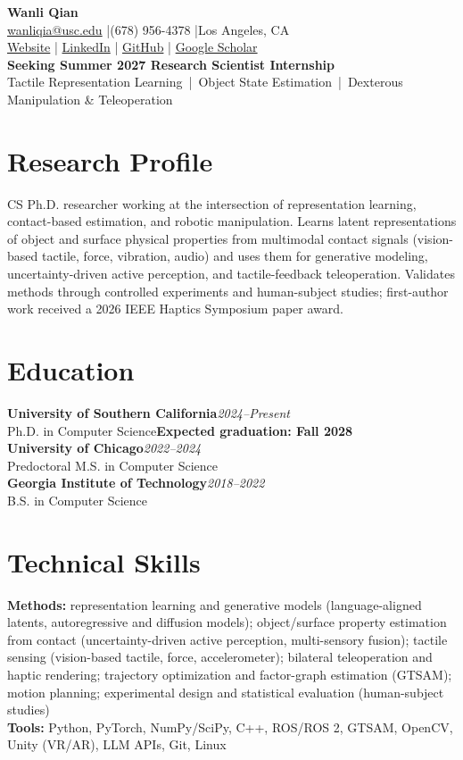 \documentclass[10pt,letterpaper]{article}
\newcommand{\entry}[2]{\textbf{#1}\hfill\textit{#2}\\}
\newcommand{\sub}[2]{#1\hfill\textbf{#2}\\}
\begin{document}
{\fontsize{24}{26}\selectfont\bfseries Wanli Qian}\\[3pt]
\href{mailto:wanliqia@usc.edu}{wanliqia@usc.edu} \enspace|\enspace (678) 956-4378 \enspace|\enspace Los Angeles, CA\\
\href{https://silverwings-zero.github.io/}{Website} \enspace|\enspace
\href{https://www.linkedin.com/in/wanli-qian-7bb399192/}{LinkedIn} \enspace|\enspace
\href{https://github.com/silverwings-zero}{GitHub} \enspace|\enspace
\href{https://scholar.google.com/citations?user=azFoAIkAAAAJ&hl=en}{Google Scholar}\\[4pt]
\textbf{Seeking Summer 2027 Research Scientist Internship}\\
{\color{navy}Tactile Representation Learning \,|\, Object State Estimation \,|\, Dexterous Manipulation \& Teleoperation}

\section{Research Profile}
CS Ph.D. researcher working at the intersection of representation learning, contact-based estimation, and robotic
manipulation. Learns latent representations of object and surface physical properties from multimodal contact signals
(vision-based tactile, force, vibration, audio) and uses them for generative modeling, uncertainty-driven active perception,
and tactile-feedback teleoperation. Validates methods through controlled experiments and human-subject studies;
first-author work received a 2026 IEEE Haptics Symposium paper award.

\section{Education}
\entry{University of Southern California}{2024--Present}
\sub{Ph.D. in Computer Science}{Expected graduation: Fall 2028}
\entry{University of Chicago}{2022--2024}
Predoctoral M.S. in Computer Science\\
\entry{Georgia Institute of Technology}{2018--2022}
B.S. in Computer Science

\section{Technical Skills}
\textbf{Methods:} representation learning and generative models (language-aligned latents, autoregressive and diffusion models);
object/surface property estimation from contact (uncertainty-driven active perception, multi-sensory fusion); tactile sensing
(vision-based tactile, force, accelerometer); bilateral teleoperation and haptic rendering; trajectory optimization and
factor-graph estimation (GTSAM); motion planning; experimental design and statistical evaluation (human-subject studies)\\
\textbf{Tools:} Python, PyTorch, NumPy/SciPy, C++, ROS/ROS 2, GTSAM, OpenCV, Unity (VR/AR), LLM APIs, Git, Linux
\end{document}
